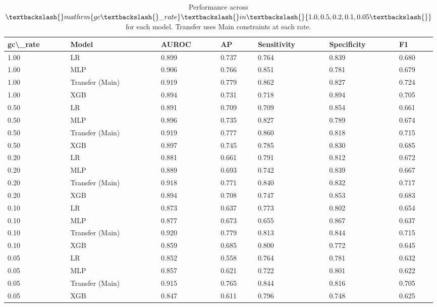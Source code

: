 \documentclass[journal,article,submit,pdftex,moreauthors]{Definitions/mdpi}
\begin{document}
\begin{table}[t]
\centering
\begin{tabular}{lllllll}
\toprule
gc\textbackslash \_rate & Model & AUROC & AP & Sensitivity & Specificity & F1 \\
\midrule
1.00 & LR & 0.899 & 0.737 & 0.764 & 0.839 & 0.680 \\
1.00 & MLP & 0.906 & 0.766 & 0.851 & 0.781 & 0.679 \\
1.00 & Transfer (Main) & 0.919 & 0.779 & 0.862 & 0.827 & 0.724 \\
1.00 & XGB & 0.894 & 0.731 & 0.718 & 0.894 & 0.705 \\
0.50 & LR & 0.891 & 0.709 & 0.709 & 0.854 & 0.661 \\
0.50 & MLP & 0.896 & 0.735 & 0.827 & 0.789 & 0.674 \\
0.50 & Transfer (Main) & 0.919 & 0.777 & 0.860 & 0.818 & 0.715 \\
0.50 & XGB & 0.897 & 0.745 & 0.785 & 0.830 & 0.685 \\
0.20 & LR & 0.881 & 0.661 & 0.791 & 0.812 & 0.672 \\
0.20 & MLP & 0.889 & 0.693 & 0.742 & 0.839 & 0.667 \\
0.20 & Transfer (Main) & 0.918 & 0.771 & 0.840 & 0.832 & 0.717 \\
0.20 & XGB & 0.894 & 0.708 & 0.747 & 0.853 & 0.683 \\
0.10 & LR & 0.873 & 0.637 & 0.773 & 0.802 & 0.654 \\
0.10 & MLP & 0.877 & 0.673 & 0.655 & 0.867 & 0.637 \\
0.10 & Transfer (Main) & 0.920 & 0.779 & 0.813 & 0.844 & 0.715 \\
0.10 & XGB & 0.859 & 0.685 & 0.800 & 0.772 & 0.645 \\
0.05 & LR & 0.852 & 0.558 & 0.764 & 0.781 & 0.632 \\
0.05 & MLP & 0.857 & 0.621 & 0.722 & 0.801 & 0.622 \\
0.05 & Transfer (Main) & 0.915 & 0.765 & 0.844 & 0.816 & 0.705 \\
0.05 & XGB & 0.847 & 0.611 & 0.796 & 0.748 & 0.625 \\
\bottomrule
\end{tabular}

\caption{Performance across $\textbackslash\{\}mathrm\{gc\textbackslash\{\}\_rate\}\textbackslash\{\}in\textbackslash\{\}\{1.0,0.5,0.2,0.1,0.05\textbackslash\{\}\}$ for each model. Transfer uses Main constraints at each rate.}
\label{tab:model-gc-rate-sweep}
\end{table}
\end{document}
